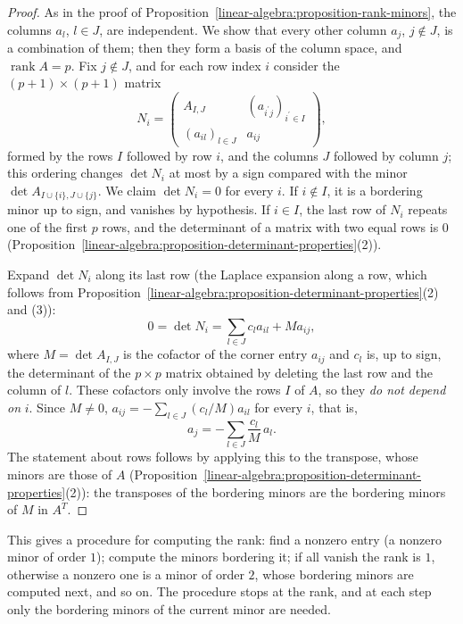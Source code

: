 \begin{proof}
As in the proof of Proposition~\ref{linear-algebra:proposition-rank-minors}, the columns $a_l$, $l \in J$, are independent. We show that every other column $a_j$, $j \notin J$, is a combination of them;
then they form a basis of the column space, and $\operatorname{rank}A = p$. Fix $j \notin J$, and for each row index $i$ consider the $(p + 1) \times (p + 1)$ matrix
\[
N_i = \begin{pmatrix}A_{I,J} & (a_{i^{\prime}j})_{i^{\prime} \in I}\\ (a_{il})_{l \in J} & a_{ij}\end{pmatrix},
\]
formed by the rows $I$ followed by row $i$, and the columns $J$ followed by column $j$; this ordering changes $\det N_i$ at most by a sign compared with the minor $\det A_{I \cup \{i\}, J \cup \{j\}}$. We
claim $\det N_i = 0$ for every $i$. If $i \notin I$, it is a bordering minor up to sign, and vanishes by hypothesis. If $i \in I$, the last row of $N_i$ repeats one of the first $p$ rows, and the
determinant of a matrix with two equal rows is $0$ (Proposition~\ref{linear-algebra:proposition-determinant-properties}(2)).

Expand $\det N_i$ along its last row (the Laplace expansion along a row, which follows from Proposition~\ref{linear-algebra:proposition-determinant-properties}(2) and (3)):
\[
0 = \det N_i = \sum_{l \in J}c_la_{il} + Ma_{ij},
\]
where $M = \det A_{I,J}$ is the cofactor of the corner entry $a_{ij}$ and $c_l$ is, up to sign, the determinant of the $p \times p$ matrix obtained by deleting the last row and the column of $l$. These
cofactors only involve the rows $I$ of $A$, so they \emph{do not depend on} $i$. Since $M \neq 0$, $a_{ij} = -\sum_{l \in J}(c_l/M)a_{il}$ for every $i$, that is,
\[
a_j = -\sum_{l \in J}\frac{c_l}{M}\,a_l .
\]
The statement about rows follows by applying this to the transpose, whose minors are those of $A$ (Proposition~\ref{linear-algebra:proposition-determinant-properties}(2)): the transposes of the bordering
minors are the bordering minors of $M$ in $A^T$.
\end{proof}

This gives a procedure for computing the rank: find a nonzero entry (a nonzero minor of order $1$); compute the minors bordering it; if all vanish the rank is $1$, otherwise a nonzero one is a minor of
order $2$, whose bordering minors are computed next, and so on. The procedure stops at the rank, and at each step only the bordering minors of the current minor are needed.

